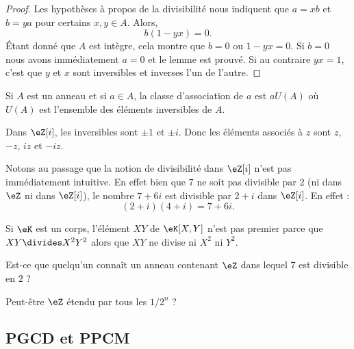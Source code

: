 \begin{proof}
	Les hypothèses à propos de la divisibilité nous indiquent que \( a=xb\) et \( b=ya\) pour certains \( x,y\in A\). Alors,
	\begin{equation}
		b(1-yx)=0.
	\end{equation}
	Étant donné que \( A\) est intègre, cela montre que \( b=0\) ou \( 1-yx=0\). Si \( b=0\) nous avons immédiatement \( a=0\) et le lemme est prouvé. Si au contraire \( yx=1\), c'est que \( y\) et \( x\) sont inversibles et inverses l'un de l'autre.
\end{proof}

\begin{lemma}       \label{LEMooJBOXooYkMRrz}
	Si \( A\) est un anneau et si \( a\in A\), la classe d'association de \( a\) est \( aU(A)\) où \( U(A)\) est l'ensemble des éléments inversibles de \( A\).
\end{lemma}

\begin{example}
	Dans \( \eZ[i]\), les inversibles sont \( \pm 1\) et \( \pm i\). Donc les éléments associés à \( z\) sont \( z\), \( -z\), \( iz\) et \( -iz\).

	Notons au passage que la notion de divisibilité dans \( \eZ[i]\) n'est pas immédiatement intuitive. En effet bien que \( 7\) ne soit pas divisible par \( 2\) (ni dans \( \eZ\) ni dans \( \eZ[i]\)), le nombre \( 7+6i\) est divisible par \( 2+i\) dans \( \eZ[i]\). En effet :
	\begin{equation}
		(2+i)(4+i)=7+6i.
	\end{equation}
\end{example}

\begin{example}
	Si \( \eK\) est un corps, l'élément \( XY\) de \( \eK[X,Y]\) n'est pas premier parce que \( XY\divides X^2Y^2\) alors que \( XY\) ne divise ni \( X^2\) ni \( Y^2\).
\end{example}

\begin{probleme}
	Est-ce que quelqu'un connaît un anneau contenant \( \eZ\) dans lequel \( 7\) est divisible en \( 2\) ?

	Peut-être \( \eZ\) étendu par tous les \( 1/2^n\) ?
\end{probleme}

\subsection{PGCD et PPCM}

